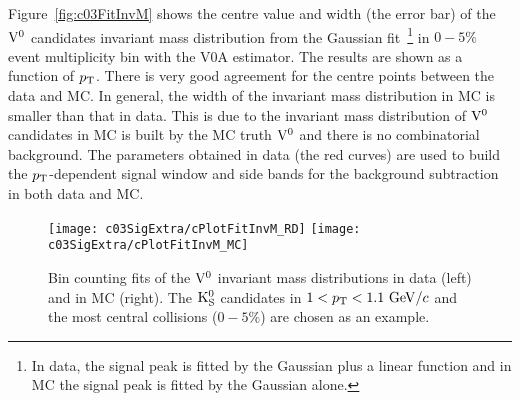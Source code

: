 Figure~\ref{fig:c03FitInvM} shows the centre value and width (the error bar)
of the ${\rm V}^{0}$ candidates invariant mass distribution from the Gaussian
fit~\footnote{In data,
the signal peak is fitted by the Gaussian plus a linear function and in MC
the signal peak is fitted by the Gaussian alone.}
in $0-5\%$ event multiplicity bin with the V0A estimator.
The results are shown as a function of $p_{\rm T}$.
There is very good agreement for the centre points between the data and MC.
In general, the width of the invariant mass distribution in MC is smaller
than that in data.
This is due to the invariant mass distribution of ${\rm V}^{0}$ candidates in MC
is built by the MC truth ${\rm V}^{0}$ and there is no combinatorial background.
The parameters obtained in data (the red curves) are used to build the
$p_{\rm T}$-dependent signal window and side bands for the background subtraction
in both data and MC.

\begin{figure}[htb]
\begin{center}
\texttt{[image: c03SigExtra/cPlotFitInvM\_RD]}
\texttt{[image: c03SigExtra/cPlotFitInvM\_MC]}
\caption{Bin counting fits of the ${\rm V}^{0}$ invariant mass distributions in data (left) and in MC (right).
The ${\rm K}_{\rm S}^{0}$ candidates in $1<p_{\rm T}<1.1~{\rm GeV}/c$ and the most central collisions ($0-5\%$) are
chosen as an example.}
\label{fig:c03FitCbinV0s}
\end{center}
\end{figure}

